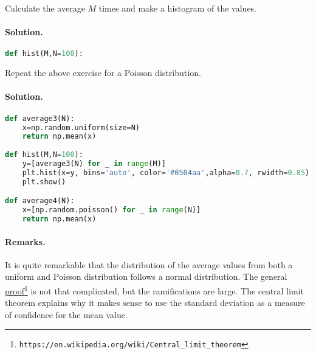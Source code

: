 \documentclass[graybox,sectrefs,envcountresetchap,open=right,final]{svmonodo}
\newenvironment{doconceexercise}{}{}
\begin{document}
\begin{doconceexercise}


Calculate the average $M$ times and make a histogram of the values.

\paragraph{Solution.}


\begin{lstlisting}[language=python,style=blue1]
def hist(M,N=100):

\end{lstlisting}




Repeat the above exercise for a Poisson distribution.

\paragraph{Solution.}













\begin{lstlisting}[language=python,style=blue1]
def average3(N):
    x=np.random.uniform(size=N)
    return np.mean(x)
    
def hist(M,N=100):
    y=[average3(N) for _ in range(M)]
    plt.hist(x=y, bins='auto', color='#0504aa',alpha=0.7, rwidth=0.85)
    plt.show()

def average4(N):
    x=[np.random.poisson() for _ in range(N)]
    return np.mean(x)

\end{lstlisting}




\paragraph{Remarks.}
It is quite remarkable that the distribution of the average values
from both a uniform and Poisson distribution follows a normal
distribution. The general
\href{{https://en.wikipedia.org/wiki/Central_limit_theorem}}{proof}\footnote{\texttt{https://en.wikipedia.org/wiki/Central\_limit\_theorem}}
is not that complicated, but the ramifications are large. The central
limit theorem explains why it makes sense to use the standard
deviation as a measure of confidence for the mean value.

\end{doconceexercise}
\end{document}
